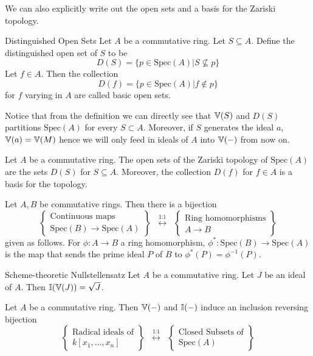 \documentclass[a4paper]{article}
\begin{document}
We can also explicitly write out the open sets and a basis for the Zariski topology. 

\begin{defn}{Distinguished Open Sets}{} Let $A$ be a commutative ring. Let $S\subseteq A$. Define the distinguished open set of $S$ to be $$D(S)=\{p\in\text{Spec}(A)|S\not\subseteq p\}$$ Let $f\in A$. Then the collection $$D(f)=\{p\in\text{Spec}(A)|f\notin p\}$$ for $f$ varying in $A$ are called basic open sets. 
\end{defn}

Notice that from the definition we can directly see that $\mathbb{V}(S)$ and $D(S)$ partitions $\text{Spec}(A)$ for every $S\subset A$. Moreover, if $S$ generates the ideal $a$, $\mathbb{V}(a)=\mathbb{V}(M)$ hence we will only feed in ideals of $A$ into $\mathbb{V}(-)$ from now on. 

\begin{thm}{}{} Let $A$ be a commutative ring. The open sets of the Zariski topology of $\text{Spec}(A)$ are the sets $D(S)$ for $S\subseteq A$. Moreover, the collection $D(f)$ for $f\in A$ is a basis for the topology. 
\end{thm}

\begin{prp}{}{} Let $A,B$ be commutative rings. Then there is a bijection $$\left\{\substack{\text{Continuous maps}\\\text{Spec}(B)\to\text{Spec}(A)}\right\}\;\;\overset{\text{1:1}}{\longleftrightarrow}\;\;\left\{\substack{\text{Ring homomorphisms}\\ A\to B}\right\}$$ given as follows. For $\phi:A\to B$ a ring homomorphism, $\phi^\ast:\text{Spec}(B)\to\text{Spec}(A)$ is the map that sends the prime ideal $P$ of $B$ to $\phi^\ast(P)=\phi^{-1}(P)$. 
\end{prp}

\begin{thm}{Scheme-theoretic Nullstellensatz}{} Let $A$ be a commutative ring. Let $J$ be an ideal of $A$. Then $\mathbb{I}(\mathbb{V}(J))=\sqrt{J}$. 
\end{thm}

\begin{crl}{}{} Let $A$ be a commutative ring. Then $\mathbb{V}(-)$ and $\mathbb{I}(-)$ induce an inclusion reversing bijection $$\left\{\substack{\text{Radical ideals of}\\ k[x_1,\dots,x_n]}\right\}\;\;\overset{\text{1:1}}{\longleftrightarrow}\;\;\left\{\substack{\text{Closed Subsets of}\\\text{Spec}(A)}\right\}$$
\end{crl}
\end{document}
